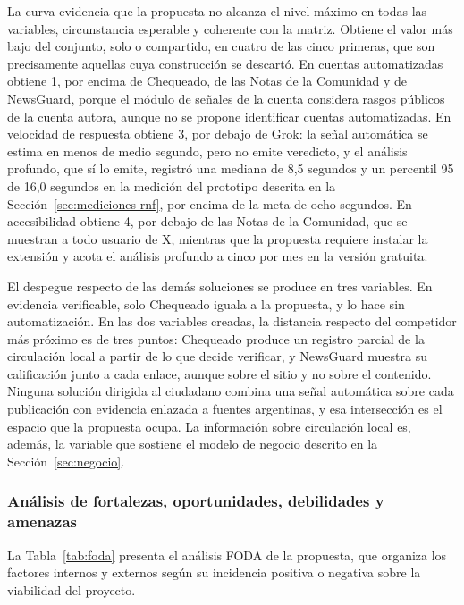 La curva evidencia que la propuesta no alcanza el nivel máximo en todas las variables, circunstancia esperable y coherente con la matriz. Obtiene el valor más bajo del conjunto, solo o compartido, en cuatro de las cinco primeras, que son precisamente aquellas cuya construcción se descartó. En cuentas automatizadas obtiene 1, por encima de Chequeado, de las Notas de la Comunidad y de NewsGuard, porque el módulo de señales de la cuenta considera rasgos públicos de la cuenta autora, aunque no se propone identificar cuentas automatizadas. En velocidad de respuesta obtiene 3, por debajo de Grok: la señal automática se estima en menos de medio segundo, pero no emite veredicto, y el análisis profundo, que sí lo emite, registró una mediana de 8,5 segundos y un percentil 95 de 16,0 segundos en la medición del prototipo descrita en la Sección~\ref{sec:mediciones-rnf}, por encima de la meta de ocho segundos. En accesibilidad obtiene 4, por debajo de las Notas de la Comunidad, que se muestran a todo usuario de X, mientras que la propuesta requiere instalar la extensión y acota el análisis profundo a cinco por mes en la versión gratuita.

El despegue respecto de las demás soluciones se produce en tres variables. En evidencia verificable, solo Chequeado iguala a la propuesta, y lo hace sin automatización. En las dos variables creadas, la distancia respecto del competidor más próximo es de tres puntos: Chequeado produce un registro parcial de la circulación local a partir de lo que decide verificar, y NewsGuard muestra su calificación junto a cada enlace, aunque sobre el sitio y no sobre el contenido. Ninguna solución dirigida al ciudadano combina una señal automática sobre cada publicación con evidencia enlazada a fuentes argentinas, y esa intersección es el espacio que la propuesta ocupa. La información sobre circulación local es, además, la variable que sostiene el modelo de negocio descrito en la Sección~\ref{sec:negocio}.

\subsubsection{Análisis de fortalezas, oportunidades, debilidades y amenazas}

La Tabla~\ref{tab:foda} presenta el análisis FODA \parencite{KotlerKeller2016} de la propuesta, que organiza los factores internos y externos según su incidencia positiva o negativa sobre la viabilidad del proyecto.

